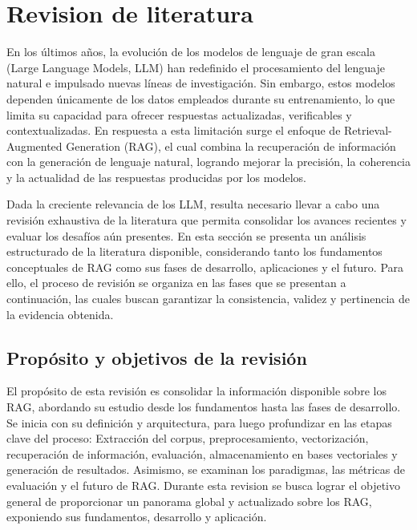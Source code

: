 \section{Revision de literatura}
En los últimos años, la evolución de los modelos de lenguaje de gran escala (Large Language Models, LLM) han redefinido el procesamiento del lenguaje natural
e impulsado nuevas líneas de investigación. 
Sin embargo, estos modelos dependen únicamente de los datos empleados durante su entrenamiento, lo que limita su capacidad para ofrecer respuestas actualizadas, verificables y 
contextualizadas. En respuesta a esta limitación surge el enfoque de Retrieval-Augmented Generation (RAG), el cual combina la recuperación de información con la generación de 
lenguaje natural, logrando mejorar la precisión, la coherencia y la actualidad de las respuestas producidas por los modelos.

Dada la creciente relevancia de los LLM, resulta necesario llevar a cabo una revisión exhaustiva de la literatura que permita consolidar los avances recientes y evaluar los desafíos aún presentes.
En esta sección se presenta un análisis estructurado de la literatura disponible, considerando tanto los fundamentos conceptuales de RAG como sus fases de desarrollo, 
aplicaciones y el futuro. Para ello, el proceso de revisión se organiza en las fases que se presentan a continuación, las cuales buscan garantizar la consistencia, validez 
y pertinencia de la evidencia obtenida.

\subsection{Propósito y objetivos de la revisión}
El propósito de esta revisión es consolidar la información disponible sobre los RAG, abordando su estudio desde los fundamentos hasta las fases de desarrollo. 
Se inicia con su definición y arquitectura, para luego profundizar en las etapas clave del proceso: Extracción del corpus, preprocesamiento, vectorización, recuperación de información, 
evaluación, almacenamiento en bases vectoriales y generación de resultados. Asimismo, se examinan los paradigmas, las métricas de evaluación y el futuro de RAG.
Durante esta revision se busca lograr el objetivo general de proporcionar un panorama global y actualizado sobre los RAG,
exponiendo sus fundamentos, desarrollo y aplicación.

